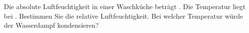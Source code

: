 Die absolute Luftfeuchtigkeit in einer Waschküche beträgt \rWkO. Die Temperatur liegt bei \thWO. Bestimmen Sie die relative Luftfeuchtigkeit. Bei welcher Temperatur würde der Wasserdampf kondensieren?
